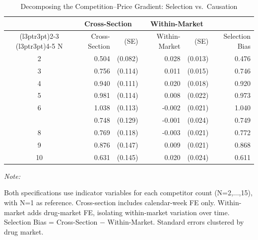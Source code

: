 \begin{table}[!h]
\centering
\caption{\label{tab:tab:selection_gap}Decomposing the Competition--Price Gradient: Selection vs.\ Causation}
\centering
\begin{threeparttable}
\begin{tabular}[t]{crrrrr}
\toprule
\multicolumn{1}{c}{ } & \multicolumn{2}{c}{Cross-Section} & \multicolumn{2}{c}{Within-Market} & \multicolumn{1}{c}{ } \\
\cmidrule(l{3pt}r{3pt}){2-3} \cmidrule(l{3pt}r{3pt}){4-5}
N & Cross-Section & (SE) & Within-Market & (SE)  & Selection Bias\\
\midrule
2 & 0.504 & (0.082) & 0.028 & (0.013) & 0.476\\
3 & 0.756 & (0.114) & 0.011 & (0.015) & 0.746\\
4 & 0.940 & (0.111) & 0.020 & (0.018) & 0.920\\
5 & 0.981 & (0.114) & 0.008 & (0.022) & 0.973\\
6 & 1.038 & (0.113) & -0.002 & (0.021) & 1.040\\
\addlinespace
7 & 0.748 & (0.129) & -0.001 & (0.024) & 0.749\\
8 & 0.769 & (0.118) & -0.003 & (0.021) & 0.772\\
9 & 0.876 & (0.147) & 0.009 & (0.021) & 0.868\\
10 & 0.631 & (0.145) & 0.020 & (0.024) & 0.611\\
\bottomrule
\end{tabular}
\begin{tablenotes}
\item \textit{Note: } 
\item Both specifications use indicator variables for each competitor count (N=2,...,15), with N=1 as reference. Cross-section includes calendar-week FE only. Within-market adds drug-market FE, isolating within-market variation over time. Selection Bias = Cross-Section $-$ Within-Market. Standard errors clustered by drug market.
\end{tablenotes}
\end{threeparttable}
\end{table}
